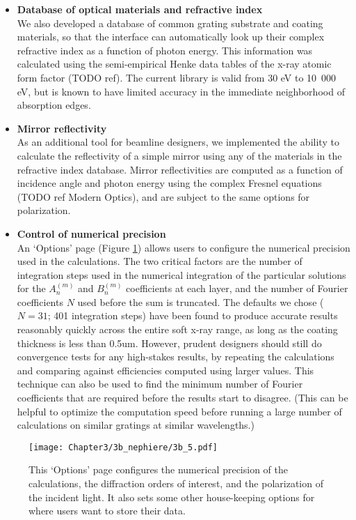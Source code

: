 \begin{itemize}
\item \textbf{Database of optical materials and refractive index}\\
We also developed a database of common grating substrate and coating materials, so that the interface can automatically look up their complex refractive index as a function of photon energy.  This information was calculated using the semi-empirical Henke data tables of the x-ray atomic form factor (TODO ref).  The current library is valid from 30 eV to 10~000 eV, but is known to have limited accuracy in the immediate neighborhood of absorption edges.

\item \textbf{Mirror reflectivity}\\
As an additional tool for beamline designers, we implemented the ability to calculate the reflectivity of a simple mirror using any of the materials in the refractive index database.  Mirror reflectivities are computed as a function of incidence angle and photon energy using the complex Fresnel equations (TODO ref Modern Optics), and are subject to the same options for polarization.

\item \textbf{Control of numerical precision}\\
An `Options' page (Figure \ref{3b_5}) allows users to configure the numerical precision used in the calculations.  The two critical factors are the number of integration steps used in the numerical integration of the particular solutions for the $A_n^{(m)}$ and $B_n^{(m)}$ coefficients at each layer, and the number of Fourier coefficients $N$ used before the sum is truncated.  The defaults we chose ($N=31$; 401 integration steps) have been found to produce accurate results reasonably quickly across the entire soft x-ray range, as long as the coating thickness is less than 0.5um.   However, prudent designers should still do convergence tests for any high-stakes results, by repeating the calculations and comparing against efficiencies computed using larger values.  This technique can also be used to find the minimum number of Fourier coefficients that are required before the results start to disagree.  (This can be helpful to optimize the computation speed before running a large number of calculations on similar gratings at similar wavelengths.)
\end{itemize}

\begin{figure}[p] %
   \centering
   \texttt{[image: Chapter3/3b\_nephiere/3b\_5.pdf]}
   \caption{This `Options' page configures the numerical precision of the calculations, the diffraction orders of interest, and the polarization of the incident light.  It also sets some other house-keeping options for where users want to store their data.}
   \label{3b_5}
\end{figure}

